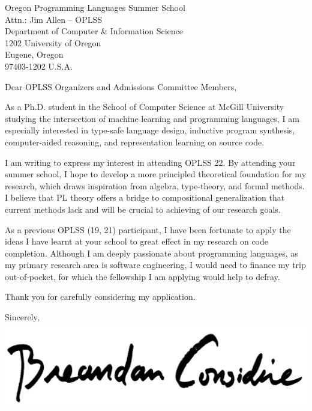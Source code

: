 \documentclass{letter}
\begin{document}
    \begin{letter}{Oregon Programming Languages Summer School\\Attn.: Jim Allen -- OPLSS\\Department of Computer \& Information Science\\1202 University of Oregon\\Eugene, Oregon\\97403-1202 U.S.A.}
        \opening{Dear OPLSS Organizers and Admissions Committee Members,}
        As a Ph.D. student in the School of Computer Science at McGill University studying the intersection of machine learning and programming languages, I am especially interested in type-safe language design, inductive program synthesis, computer-aided reasoning, and representation learning on source code.

        I am writing to express my interest in attending OPLSS \textsc{}22. By attending your summer school, I hope to develop a more principled theoretical foundation for my research, which draws inspiration from algebra, type-theory, and formal methods. I believe that PL theory offers a bridge to compositional generalization that current methods lack and will be crucial to achieving of our research goals.

        As a previous OPLSS (\textsc{}19, \textsc{}21) participant, I have been fortunate to apply the ideas I have learnt at your school to great effect in my research on code completion. Although I am deeply passionate about programming languages, as my primary research area is software engineering, I would need to finance my trip out-of-pocket, for which the fellowship I am applying would help to defray.

        Thank you for carefully considering my application.

        \closing{Sincerely,\\
        \includegraphics[scale=0.06]{signature.png}\\
        }
    \end{letter}
\end{document}
